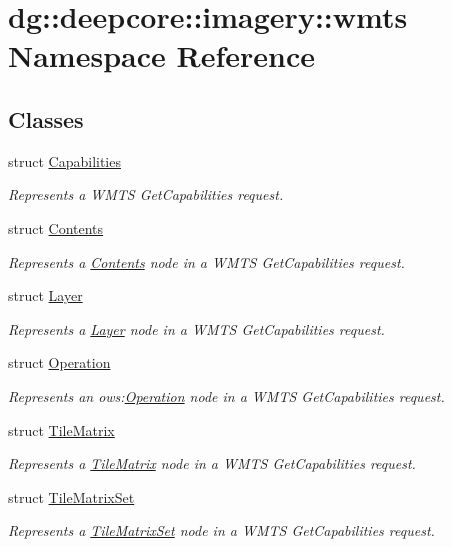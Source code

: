 \hypertarget{namespacedg_1_1deepcore_1_1imagery_1_1wmts}{}\section{dg\+:\+:deepcore\+:\+:imagery\+:\+:wmts Namespace Reference}
\label{namespacedg_1_1deepcore_1_1imagery_1_1wmts}
\subsection*{Classes}
\begin{DoxyCompactItemize}
\item 
struct \hyperlink{structdg_1_1deepcore_1_1imagery_1_1wmts_1_1_capabilities}{Capabilities}
\begin{DoxyCompactList}\small\item\em Represents a W\+M\+TS Get\+Capabilities request. \end{DoxyCompactList}\item 
struct \hyperlink{structdg_1_1deepcore_1_1imagery_1_1wmts_1_1_contents}{Contents}
\begin{DoxyCompactList}\small\item\em Represents a \hyperlink{structdg_1_1deepcore_1_1imagery_1_1wmts_1_1_contents}{Contents} node in a W\+M\+TS Get\+Capabilities request. \end{DoxyCompactList}\item 
struct \hyperlink{structdg_1_1deepcore_1_1imagery_1_1wmts_1_1_layer}{Layer}
\begin{DoxyCompactList}\small\item\em Represents a \hyperlink{structdg_1_1deepcore_1_1imagery_1_1wmts_1_1_layer}{Layer} node in a W\+M\+TS Get\+Capabilities request. \end{DoxyCompactList}\item 
struct \hyperlink{structdg_1_1deepcore_1_1imagery_1_1wmts_1_1_operation}{Operation}
\begin{DoxyCompactList}\small\item\em Represents an ows\+:\hyperlink{structdg_1_1deepcore_1_1imagery_1_1wmts_1_1_operation}{Operation} node in a W\+M\+TS Get\+Capabilities request. \end{DoxyCompactList}\item 
struct \hyperlink{structdg_1_1deepcore_1_1imagery_1_1wmts_1_1_tile_matrix}{Tile\+Matrix}
\begin{DoxyCompactList}\small\item\em Represents a \hyperlink{structdg_1_1deepcore_1_1imagery_1_1wmts_1_1_tile_matrix}{Tile\+Matrix} node in a W\+M\+TS Get\+Capabilities request. \end{DoxyCompactList}\item 
struct \hyperlink{structdg_1_1deepcore_1_1imagery_1_1wmts_1_1_tile_matrix_set}{Tile\+Matrix\+Set}
\begin{DoxyCompactList}\small\item\em Represents a \hyperlink{structdg_1_1deepcore_1_1imagery_1_1wmts_1_1_tile_matrix_set}{Tile\+Matrix\+Set} node in a W\+M\+TS Get\+Capabilities request. \end{DoxyCompactList}\end{DoxyCompactItemize}
